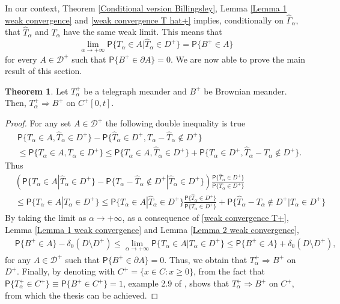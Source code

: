 \documentclass{article}
\theoremstyle{definition}
\newtheorem{theorem}{Theorem}[section]
\numberwithin{equation}{section}
\begin{document}
In our context, Theorem \ref{Conditional version Billingsley}, Lemma \ref{Lemma 1 weak convergence} and \eqref{weak convergence T hat+} implies, conditionally on $\hat{\Gamma}_\alpha$, that $\hat{T}_\alpha$ and $T_\alpha$ have the same weak limit. This means that
\begin{equation}\label{weak convergence T+}
\lim_{\alpha \to +\infty}\mathsf{P}\{T_\alpha \in A|\hat{T}_\alpha \in D^+\} = \mathsf{P}\{B^+ \in A\} 
\end{equation}
for every $A \in \mathcal{D}^+$ such that $\mathsf{P}\{B^+ \in \partial A\} = 0$. 
We are now able to prove the main result of this section.
\begin{theorem}
Let $T_\alpha^+$ be a telegraph meander and $B^+$ be Brownian meander. Then, $T_\alpha^+ \Rightarrow B^+$ on $C^+[0,t]$.
\end{theorem}
\begin{proof}
For any set $A \in \mathcal{D}^+$ the following double inequality is true
\begin{align*}
&\mathsf{P}\{T_\alpha \in A, \hat{T}_\alpha \in D^+\} -\mathsf{P}\{\hat{T}_\alpha \in D^+,T_\alpha- \hat{T}_\alpha \notin D^+\} \\
&\leq \mathsf{P}\{T_\alpha \in A, T_\alpha \in D^+\} \leq \mathsf{P}\{T_\alpha \in A, \hat{T}_\alpha \in D^+\}+\mathsf{P}\{T_\alpha \in D^+, \hat{T}_\alpha- T_\alpha \notin D^+\}.
\end{align*}
Thus
\begin{align*}
&(\mathsf{P}\{T_\alpha \in A| \hat{T}_\alpha \in D^+\} -\mathsf{P}\{T_\alpha- \hat{T}_\alpha \notin D^+|\hat{T}_\alpha \in D^+\})\frac{\mathsf{P}\{\hat{T}_\alpha \in D^+\}}{\mathsf{P}\{T_\alpha \in D^+\}} \\
&\leq \mathsf{P}\{T_\alpha \in A| T_\alpha \in D^+\} \leq \mathsf{P}\{T_\alpha \in A|\hat{T}_\alpha \in D^+\}\frac{\mathsf{P}\{\hat{T}_\alpha \in D^+\}}{\mathsf{P}\{T_\alpha \in D^+\}}+\mathsf{P}\{\hat{T}_\alpha- T_\alpha \notin D^+|T_\alpha \in D^+\}
\end{align*}
By taking the limit as $\alpha \to +\infty$, as a consequence of \eqref{weak convergence T+}, Lemma \ref{Lemma 1 weak convergence} and Lemma \ref{Lemma 2 weak convergence},
\begin{align*}
&\mathsf{P}\{B^+ \in A\} -\delta_0(D\setminus D^+) \leq \lim_{\alpha \to +\infty}\mathsf{P}\{T_\alpha \in A| T_\alpha \in D^+\} \leq \mathsf{P}\{B^+ \in A \}+\delta_0(D\setminus D^+),
\end{align*}
for any $A \in \mathcal{D}^+$ such that $\mathsf{P}\{B^+ \in \partial A\} = 0$. Thus, we obtain that $T^+_\alpha \Rightarrow B^+$ on $D^+$. Finally, by denoting with $C^+ = \{x \in C: x \geq 0\}$, from the fact that $\mathsf{P}\{T^+_\alpha \in C^+\} \equiv \mathsf{P}\{B^+ \in C^+\} = 1$, example 2.9 of \cite{Billingsley}, shows that $T^+_\alpha \Rightarrow B^+$ on $C^+$, from which the thesis can be achieved.
\end{proof}
\end{document}
